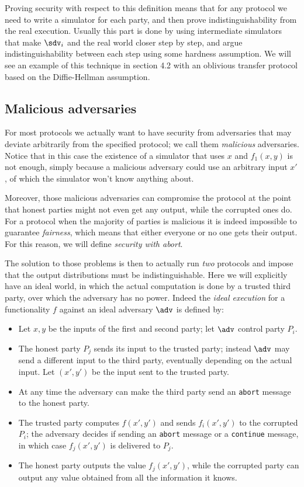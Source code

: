 Proving security with respect to this definition means that for any protocol we need to write a simulator for each party, and then prove indistinguishability from the real execution. Usually this part is done by using intermediate simulators that make $\sdv_i$ and the real world closer step by step, and argue indistinguishability between each step using some hardness assumption. We will see an example of this technique in section 4.2 with an oblivious transfer protocol based on the Diffie-Hellman assumption.

\subsection{Malicious adversaries}

For most protocols we actually want to have security from adversaries that may deviate arbitrarily from the specified protocol; we call them \emph{malicious} adversaries. Notice that in this case the existence of a simulator that uses $x$ and $f_1(x,y)$ is not enough, simply because a malicious adversary could use an arbitrary input $x'$, of which the simulator won't know anything about.

Moreover, those malicious adversaries can compromise the protocol at the point that honest parties might not even get any output, while the corrupted ones do. For a protocol when the majority of parties is malicious it is indeed impossible to guarantee \emph{fairness}, which means that either everyone or no one gets their output. For this reason, we will define \emph{security with abort}.

The solution to those problems is then to actually run \emph{two} protocols and impose that the output distributions must be indistinguishable. Here we will explicitly have an ideal world, in which the actual computation is done by a trusted third party, over which the adversary has no power. Indeed the \emph{ideal execution} for a functionality $f$ against an ideal adversary $\adv$ is defined by:
\begin{itemize}
    \item Let $x,y$ be the inputs of the first and second party; let $\adv$ control party $P_i$.
    \item The honest party $P_j$ sends its input to the trusted party; instead $\adv$ may send a different input to the third party, eventually depending on the actual input. Let $(x',y')$ be the input sent to the trusted party.
    \item At any time the adversary can make the third party send an \texttt{abort} message to the honest party.
    \item The trusted party computes $f(x',y')$ and sends $f_i(x',y')$ to the corrupted $P_i$; the adversary decides if sending an \texttt{abort} message or a \texttt{continue} message, in which case $f_j(x',y')$ is delivered to $P_j$.
    \item The honest party outputs the value $f_j(x',y')$, while the corrupted party can output any value obtained from all the information it knows.
\end{itemize}

